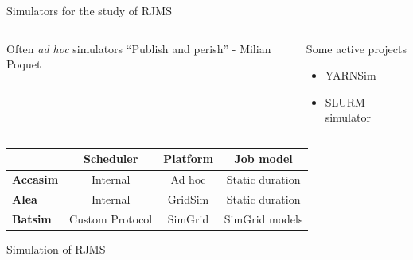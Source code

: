 \documentclass[12pt, aspectratio=43]{beamer}
\begin{document}

\begin{frame}{Simulators for the study of RJMS}
	\begin{columns}
		\begin{block}{Often \textit{ad hoc} simulators}
			``Publish and perish'' - Milian Poquet
		\end{block}

		\begin{exampleblock}{Some active projects}
			\begin{itemize}
				\item YARNSim
				\item SLURM simulator
			\end{itemize}
		\end{exampleblock}
	\end{columns}

	\vspace{2ex}
	\begin{tabular}{lccc}
		\hline
		& \textbf{Scheduler} & \textbf{Platform} & \textbf{Job model}\\
		\hline\hline
		\textbf{Accasim} & Internal & Ad hoc & Static duration\\
		\textbf{Alea} & Internal & GridSim & Static duration\\
		\textbf{Batsim} & Custom Protocol & SimGrid & SimGrid models\\
		\hline
	\end{tabular}
	\vspace{1ex}
	\centering
	{\small Simulation of RJMS}

\end{frame}

%
%
\end{document}
